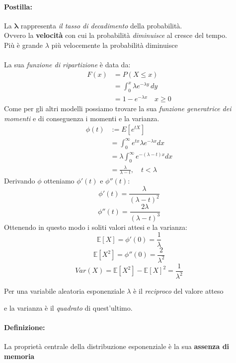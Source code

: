 \documentclass[]{article}
\newcommand{\ev}{\mathbb{E}[X]}
\renewcommand{\ev}[1]{\mathbb{E}[#1]}
\newcommand{\definizione}{\paragraph{Definizione:}}
\begin{document}
    \paragraph{Postilla:} La $\boldsymbol{\lambda}$ rappresenta \textit{il tasso di decadimento} della probabilità. \\
    Ovvero la \textbf{velocità} con cui la probabilità \textit{diminuisce} al cresce del tempo. \\ 
    Più è grande $\lambda$ più velocemente la probabilità diminuisce \\ \\
    La sua \textit{funzione di ripartizione} è data da:
    \begin{equation*}
        \begin{split}
            F(x) &= P(X \leq x) \\
            &= \int_{0}^{x} \lambda e^{-\lambda y} \, dy \\
            &= 1 - e^{-\lambda x} \quad x \geq 0
        \end{split}
    \end{equation*}
    Come per gli altri modelli possiamo trovare la sua \textit{funzione generatrice dei momenti} e di conseguenza i momenti e la varianza. \\
    \begin{equation}
        \begin{aligned}
            \phi(t) & :=E\left[e^{t X}\right] \\
            & =\int_0^{\infty} e^{t x} \lambda e^{-\lambda x} d x \\
            & =\lambda \int_0^{\infty} e^{-(\lambda-t) x} d x \\
            & =\frac{\lambda}{\lambda-t}, \quad t<\lambda
        \end{aligned}
    \end{equation}
    Derivando $\phi$ otteniamo $\phi'(t)$ e $\phi''(t)$:
    \[ \phi'(t) = \frac{\lambda}{(\lambda - t)^2}\]
    \[ \phi''(t) = \frac{2\lambda}{(\lambda - t)^3}\]
    Ottenendo in questo modo i soliti valori attesi e la varianza:
    \[ \ev{X} = \phi'(0) = \frac{1}{\lambda} \]
    \[ \ev{X^2} = \phi''(0) = \frac{2}{\lambda^2} \]
    \[ Var(X) = \ev{X^2} - \ev{X}^2 = \frac{1}{\lambda^2} \]
    \centerline{Per una variabile aleatoria esponenziale $\lambda$ è il \textit{reciproco} del valore atteso}
    \centerline{e la varianza è il \textit{quadrato} di quest'ultimo.}

    \definizione La proprietà centrale della distribuzione esponenziale è la sua \textbf{assenza di memoria}
\end{document}

